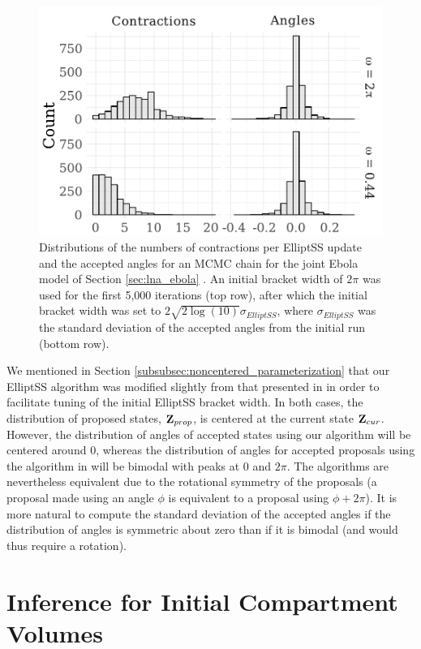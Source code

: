 \begin{figure}
	\centering
	\includegraphics[width=0.7\linewidth]{figures/ess_tuning}
	\caption[Distributions of numbers of contractions and accepted for elliptical slice sampling.]{Distributions of the numbers of contractions per ElliptSS update and the accepted angles for an MCMC chain for the joint Ebola model of Section \ref{sec:lna_ebola} . An initial bracket width of $ 2\pi $ was used for the first 5,000 iterations (top row), after which the initial bracket width was set to $ 2\sqrt{2\log(10)}\sigma_{ElliptSS} $, where $ \sigma_{ElliptSS} $ was the standard deviation of the accepted angles from the initial run (bottom row).} 
	\label{fig:esstuning}
\end{figure}

We mentioned in Section \ref{subsubsec:noncentered_parameterization} that our ElliptSS algorithm was modified slightly from that presented in \cite{murray2010} in order to facilitate tuning of the initial ElliptSS bracket width. In both cases, the distribution of proposed states, $ \mathbf{Z}_{prop} $, is centered at the current state $ \mathbf{Z}_{cur} $. However, the distribution of angles of accepted states using our algorithm will be centered around 0, whereas the distribution of angles for accepted proposals using the algorithm in \cite{murray2010} will be bimodal with peaks at 0 and $ 2\pi $. The algorithms are nevertheless equivalent due to the rotational symmetry of the proposals (a proposal made using an angle $ \phi $ is equivalent to a proposal using $ \phi+2\pi $). It is more natural to compute the standard deviation of the accepted angles if the distribution of angles is symmetric about zero than if it is bimodal (and would thus require a rotation).

\section{Inference for Initial Compartment Volumes}
\label{sec:lna_init_volumes}

